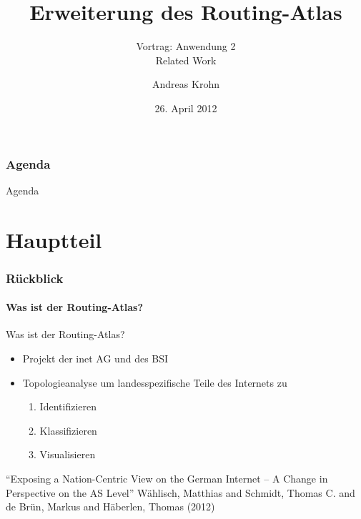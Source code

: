 \documentclass[ngerman,compress,hyperref={bookmarks}]{beamer}
\title{Erweiterung des Routing-Atlas}
\subtitle{Vortrag: Anwendung 2\\ Related Work}
\author{Andreas Krohn}
\institute[HAW]{Hochschule für Angewandte Wissenschaften Hamburg}
\date[SoSe 2012]{26. April 2012}
\begin{document}
\frame[plain]{\titlepage}

\section*{Agenda}
\begin{frame}{Agenda} \setcounter{tocdepth}{1} \tableofcontents[part=1] \setcounter{tocdepth}{3} \end{frame}

\part{Hauptteil}
\section{Rückblick}

\subsection{Was ist der Routing-Atlas?}
\begin{frame}{Was ist der Routing-Atlas?}
\nocite{wsbh-envgi-12}
  \begin{itemize}
    \item Projekt der inet AG und des BSI
    \item Topologieanalyse um landesspezifische Teile des Internets zu
    \begin{enumerate}
      \item Identifizieren
      \item Klassifizieren
      \item Visualisieren
    \end{enumerate}
  \end{itemize}
  \vspace{1cm}
  \begin{thebibliography}{}
     ``Exposing a Nation-Centric View on the German Internet – A Change in Perspective on the AS Level''
    \newblock Wählisch, Matthias and Schmidt, Thomas C. and de Brün, Markus and Häberlen, Thomas (2012)\\[-20pt]
  \end{thebibliography}
\end{frame}
\end{document}
